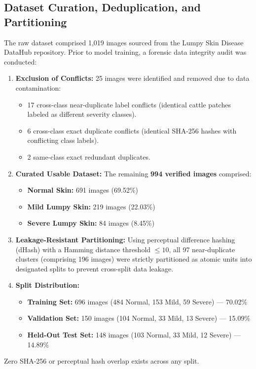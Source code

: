 \documentclass[conference]{IEEEtran}
\begin{document}
\subsection{Dataset Curation, Deduplication, and Partitioning}
The raw dataset comprised 1,019 images sourced from the Lumpy Skin Disease DataHub repository. Prior to model training, a forensic data integrity audit was conducted:
\begin{enumerate}
    \item \textbf{Exclusion of Conflicts:} 25 images were identified and removed due to data contamination:
    \begin{itemize}
        \item 17 cross-class near-duplicate label conflicts (identical cattle patches labeled as different severity classes).
        \item 6 cross-class exact duplicate conflicts (identical SHA-256 hashes with conflicting class labels).
        \item 2 same-class exact redundant duplicates.
    \end{itemize}
    \item \textbf{Curated Usable Dataset:} The remaining \textbf{994 verified images} comprised:
    \begin{itemize}
        \item \textbf{Normal Skin:} 691 images (69.52\%)
        \item \textbf{Mild Lumpy Skin:} 219 images (22.03\%)
        \item \textbf{Severe Lumpy Skin:} 84 images (8.45\%)
    \end{itemize}
    \item \textbf{Leakage-Resistant Partitioning:} Using perceptual difference hashing (dHash) with a Hamming distance threshold $\le 10$, all 97 near-duplicate clusters (comprising 196 images) were strictly partitioned as atomic units into designated splits to prevent cross-split data leakage.
    \item \textbf{Split Distribution:}
    \begin{itemize}
        \item \textbf{Training Set:} 696 images (484 Normal, 153 Mild, 59 Severe) --- 70.02\%
        \item \textbf{Validation Set:} 150 images (104 Normal, 33 Mild, 13 Severe) --- 15.09\%
        \item \textbf{Held-Out Test Set:} 148 images (103 Normal, 33 Mild, 12 Severe) --- 14.89\%
    \end{itemize}
\end{enumerate}
Zero SHA-256 or perceptual hash overlap exists across any split.
\end{document}
